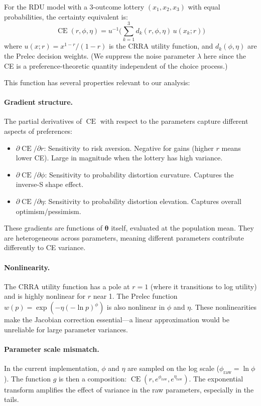 \documentclass[11pt,a4paper]{article}
\theoremstyle{definition}
\newcommand{\btheta}{\boldsymbol{\theta}}
\DeclareMathOperator{\CE}{CE}
\begin{document}
For the RDU model with a 3-outcome lottery $(x_1, x_2, x_3)$ with equal
probabilities, the certainty equivalent is:
\begin{equation}
    \CE(r, \phi, \eta) = u^{-1}\!\Big(\sum_{k=1}^3 d_k(r, \phi, \eta) \,
    u(x_k; r)\Big)
\end{equation}
where $u(x; r) = x^{1-r}/(1-r)$ is the CRRA utility function, and
$d_k(\phi, \eta)$ are the Prelec decision weights. (We suppress the noise
parameter $\lambda$ here since the CE is a preference-theoretic quantity
independent of the choice process.)

This function has several properties relevant to our analysis:

\paragraph{Gradient structure.} The partial derivatives of $\CE$ with respect
to the parameters capture different aspects of preferences:
\begin{itemize}
    \item $\partial \CE / \partial r$: Sensitivity to risk aversion. Negative
    for gains (higher $r$ means lower CE). Large in magnitude when the lottery
    has high variance.
    \item $\partial \CE / \partial \phi$: Sensitivity to probability distortion
    curvature. Captures the inverse-S shape effect.
    \item $\partial \CE / \partial \eta$: Sensitivity to probability distortion
    elevation. Captures overall optimism/pessimism.
\end{itemize}
These gradients are functions of $\btheta$ itself, evaluated at the population
mean. They are heterogeneous across parameters, meaning different parameters
contribute differently to CE variance.

\paragraph{Nonlinearity.} The CRRA utility function has a pole at $r = 1$
(where it transitions to log utility) and is highly nonlinear for $r$ near 1.
The Prelec function $w(p) = \exp(-\eta(-\ln p)^\phi)$ is also nonlinear in
$\phi$ and $\eta$. These nonlinearities make the Jacobian correction
essential---a linear approximation would be unreliable for large parameter
variances.

\paragraph{Parameter scale mismatch.} In the current implementation, $\phi$ and
$\eta$ are sampled on the log scale ($\phi_{\text{raw}} = \ln \phi$). The
function $g$ is then a composition: $\CE(r, e^{\phi_{\text{raw}}},
e^{\eta_{\text{raw}}})$. The exponential transform amplifies the effect of
variance in the raw parameters, especially in the tails.
\end{document}
